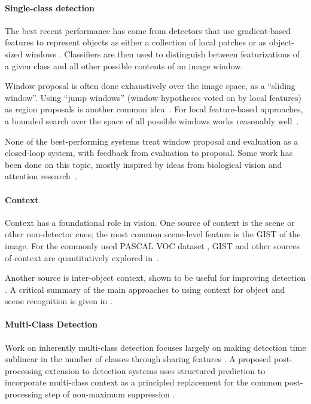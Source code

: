 \paragraph{Single-class detection}
The best recent performance has come from detectors that use gradient-based features to represent objects as either a collection of local patches or as object-sized windows \cite{Dalal2005,Lowe2004}.
Classifiers are then used to distinguish between featurizations of a given class and all other possible contents of an image window.

Window proposal is often done exhaustively over the image space, as a ``sliding window''.
Using ``jump windows'' (window hypotheses voted on by local features) as region proposals is another common idea~\cite{Vedaldi2009,Vijayanarasimhan2011}.
For local feature-based approaches, a bounded search over the space of all possible windows works reasonably well~\cite{Lampert2008a}.

None of the best-performing systems treat window proposal and evaluation as a closed-loop system, with feedback from evaluation to proposal.
Some work has been done on this topic, mostly inspired by ideas from biological vision and attention research~\cite{Butko2009,Vogel2008,Paletta2005}.

\paragraph{Context}
Context has a foundational role in vision.
One source of context is the scene or other non-detector cues; the most common scene-level feature is the GIST \cite{Oliva2001a} of the image.
For the commonly used PASCAL VOC dataset \cite{pascal-voc-2010}, GIST and other sources of context are quantitatively explored in~\cite{Divvala2009}. 

Another source is inter-object context, shown to be useful for improving detection \cite{Torralba2004}.
A critical summary of the main approaches to using context for object and scene recognition is given in \cite{Galleguillos2010}.

\paragraph{Multi-Class Detection}
Work on inherently multi-class detection focuses largely on making detection time sublinear in the number of classes through sharing features \cite{Torralba2007,Fan2005,Razavi2011}.
A proposed post-processing extension to detection systems uses structured prediction to incorporate multi-class context as a principled replacement for the common post-processing step of non-maximum suppression \cite{Desai2009}.


